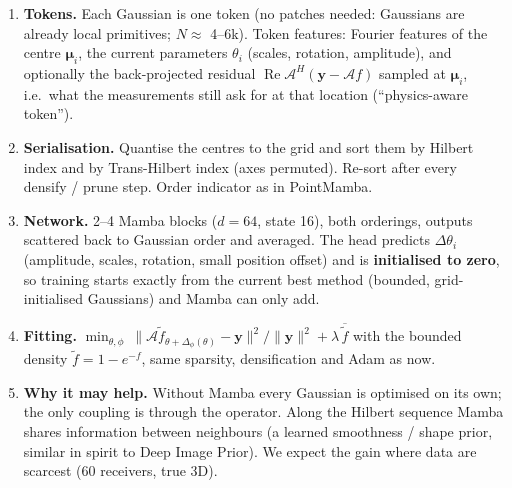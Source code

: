 \documentclass[10pt,a4paper]{article}
\newcommand{\vect}[1]{\bm{#1}}
\begin{document}
\begin{enumerate}
\item \textbf{Tokens.} Each Gaussian is one token (no patches needed: Gaussians are already local primitives;
$N\approx$ 4--6k). Token features: Fourier features of the centre $\vect\mu_i$, the current parameters
$\theta_i$ (scales, rotation, amplitude), and optionally the back-projected residual
$\operatorname{Re}\mathcal{A}^H(\vect y-\mathcal{A}f)$ sampled at $\vect\mu_i$, i.e.\ what the measurements still
ask for at that location (``physics-aware token'').
\item \textbf{Serialisation.} Quantise the centres to the grid and sort them by Hilbert index and by Trans-Hilbert
index (axes permuted). Re-sort after every densify / prune step. Order indicator as in PointMamba.
\item \textbf{Network.} 2--4 Mamba blocks ($d=64$, state 16), both orderings, outputs scattered back to Gaussian
order and averaged. The head predicts $\Delta\theta_i$ (amplitude, scales, rotation, small position offset) and is
\textbf{initialised to zero}, so training starts exactly from the current best method (bounded, grid-initialised
Gaussians) and Mamba can only add.
\item \textbf{Fitting.} $\min_{\theta,\phi}\ \lVert\mathcal{A}\tilde f_{\theta+\Delta_\phi(\theta)}-\vect y\rVert^2/\lVert\vect y\rVert^2+\lambda\,\overline{\tilde f}$
with the bounded density $\tilde f=1-e^{-f}$, same sparsity, densification and Adam as now.
\item \textbf{Why it may help.} Without Mamba every Gaussian is optimised on its own; the only coupling is through
the operator. Along the Hilbert sequence Mamba shares information between neighbours (a learned smoothness /
shape prior, similar in spirit to Deep Image Prior). We expect the gain where data are scarcest (60 receivers,
true 3D).
\end{enumerate}
\end{document}
